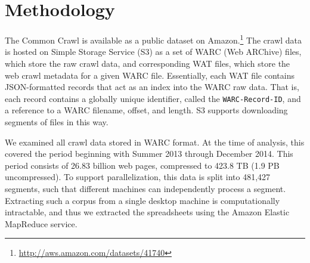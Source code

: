 \documentclass{svjour3}
\begin{document}

\section{Methodology}



The Common Crawl is available as a public dataset on Amazon.\footnote{\url{http://aws.amazon.com/datasets/41740}} The crawl data is hosted on Simple Storage Service (S3) as a set of WARC (Web ARChive) files, which store the raw crawl data, and corresponding WAT files, which store the web crawl metadata for a given WARC file. Essentially, each WAT file contains JSON-formatted records that act as an index into the WARC raw data. That is, each record contains a globally unique identifier, called the \texttt{WARC-Record-ID}, and a reference to a WARC filename, offset, and length. S3 supports downloading segments of files in this way.

We examined all crawl data stored in WARC format. At the time of analysis, this covered the period beginning with Summer 2013 through December 2014. This period consists of 26.83 billion web pages, compressed to 423.8 TB (1.9 PB uncompressed). To support parallelization, this data is split into 481,427 segments, such that different machines can independently process a segment. Extracting such a corpus from a single desktop machine is computationally intractable, and thus we extracted the spreadsheets using the Amazon Elastic MapReduce service.

\end{document}
